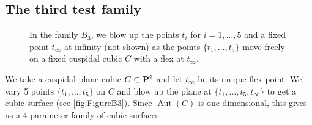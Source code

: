 \documentclass[reqno]{amsart}
\renewcommand {\P}{{\bf P}}
\providecommand{\Aut}{\operatorname{Aut}}
\numberwithin{equation}{section}
\begin{document}
\subsection{The third test family}
\label{sec:family-b_3}
\begin{figure}
    \centering


    \caption{In the family $B_3$, we blow up the points $t_i$ for $i = 1, \dots, 5$ and a fixed point $t_{\infty}$ at infinity (not shown) as the points $\{t_1, \dots, t_5\}$ move freely on a fixed cuspidal cubic $C$ with a flex at $t_{\infty}$.}
    \label{fig:FigureB3}
\end{figure}
We take a cuspidal plane cubic $C \subset \P^2$ and let $t_{\infty}$ be its unique flex point.
We vary 5 points $\{t_1, \dots, t_5\}$ on $C$ and blow up the plane at $\{t_1, \dots, t_5, t_{\infty}\}$ to get a cubic surface (see \autoref{fig:FigureB3}).
Since $\Aut(C)$ is one dimensional, this gives us a 4-parameter family of cubic surfaces.
\end{document}
